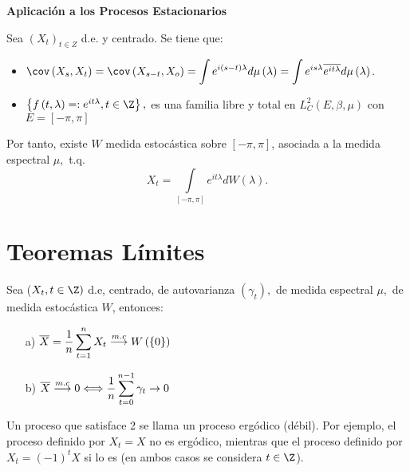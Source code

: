{\bf Aplicaci\'{o}n a los Procesos Estacionarios}\newline

Sea ${(X_{t})}_{t\in Z}$ d.e. y centrado. Se tiene que:

\begin{itemize}
\item $\displaystyle\cov\left( {X_{s} ,X_{t} } \right)=\cov\left( {X_{s-t} ,X_{o} } \right)=\int {e^{i\left( {s-t} \right)\lambda }d\mu \left( \lambda \right)=\int {e^{is\lambda }\overline {e^{it\lambda }} d\mu \left( \lambda \right)} } $. 
\item $\left\{ f\left(t,\lambda \right)=:e^{it\lambda }, t\in \Z \right\} ,$ es una familia libre y total en $L_{C}^{2} \left( {E,\beta ,\mu } \right)$ con $E=\left[ {-\pi ,\pi } \right]$
\end{itemize}

Por tanto, existe $W$ medida estoc\'{a}stica sobre $\left[ {-\pi ,\pi } \right]$, asociada a la medida espectral $\mu ,$ t.q.
\[
X_{t} =\int\limits_{\left[ {-\pi ,\pi } \right]} {e^{it\lambda }} dW\left( \lambda \right).
\]

\section{Teoremas L\'{i}mites}

\begin{teorema}
Sea ($X_{t} ,t\in \Z)$ d.e, centrado, de autovarianza $\left( {\gamma_{t} } \right),$ de medida espectral $\mu ,$ de medida estoc\'{a}stica $W$, 
entonces: 
\begin{enumerate}
 \item[a)] $\displaystyle\overline{X}=\frac{1}{n}\sum_{t=1}^n X_{t} \buildrel 
{m.c} \over \longrightarrow W\left( \left\{ 0 \right\} \right)$ 
\item[b)] $\displaystyle\overline{X} \buildrel {m.c} \over \longrightarrow 
0\Longleftrightarrow \frac{1}{n}\sum_{t=0}^{n-1} {\gamma_{t} } \to 
0$
\end{enumerate}

\end{teorema}

Un proceso que satisface 2 se llama un proceso erg\'{o}dico (d\'{e}bil). Por ejemplo, el proceso definido por $X_{t} =X$ no es erg\'{o}dico, mientras que el proceso definido por $X_{t} =\left( {-1} \right)^{t}X$ si lo es (en ambos casos se considera $t\in \Z$).

